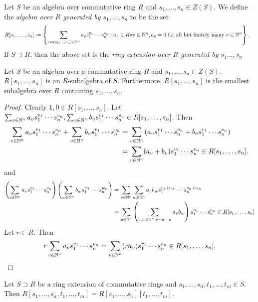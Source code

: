 \begin{definition}
    Let $S$ be an algebra over commutative ring $R$ and $s_1,\dots,s_n\in Z(S)$. We define the \textit{algebra over $R$ generated by $s_1,\dots,s_n$} to be the set 
    \begin{align*}
        R[s_1,\dots,s_n] &:= \left\{ \sum_{v=(v_1,\dots,v_n)\in \mathbb{N}^n} a_vs_1^{v_1}\cdots s_n^{v_n} : a_v\in R \forall v\in \mathbb{N}^n, a_v = 0 \text{ for all but finitely many } v\in \mathbb{N}^n \right\}.
    \end{align*}
    If $S\supset R$, then the above set is the \textit{ring extension over $R$ generated by $s_1\dots,s_n$}
\end{definition}
\begin{lemma}
    Let $S$ be an algebra over a commutative ring $R$ and $s_1,\dots,s_n\in Z(S)$. $R[s_1,\dots,s_n]$ is an $R$-subalgebra of $S$. Furthermore, $R[s_1,\dots,s_n]$ is the smallest subalgebra over $R$ containing $s_1,\dots,s_n$.   
\end{lemma}
\begin{proof}
    Clearly $1,0\in R[s_1,\dots,s_n]$. Let $\sum_{v\in \mathbb{N}^n} a_vs_1^{v_1}\cdots s_n^{v_n}, \sum_{v\in \mathbb{N}^n} b_vs_1^{v_1}\cdots s_n^{v_n}\in R[s_1,\dots,s_n]$. Then 
    \begin{align*}
        \sum_{v\in \mathbb{N}^n} a_vs_1^{v_1}\cdots s_n^{v_n}+\sum_{v\in \mathbb{N}^n} b_vs_1^{v_1}\cdots s_n^{v_n} &= \sum_{v\in \mathbb{N}^n} \left(a_vs_1^{v_1}\cdots s_n^{v_n}+b_vs_1^{v_1}\cdots s_n^{v_n}\right)\\ &= \sum_{v\in\mathbb{N}^n} (a_v+b_v)s_1^{v_1}\cdots s_n^{v_n} \in R[s_1,\dots,s_n].
    \end{align*}
    and 
    \begin{align*}
        \left(\sum_{v\in \mathbb{N}^n} a_vs_1^{v_1}\cdots s_n^{v_n}\right)\left(\sum_{w\in \mathbb{N}^n} b_ws_1^{w_1}\cdots s_n^{w_n}\right) &= \sum_{v\in \mathbb{N}^n}\sum_{w \in \mathbb{N}^n} a_vb_w s_1^{v_1+w_1}\cdots s_n^{v_n+w_n} \\
        &= \sum_{u\in \mathbb{N}^n} \left(\sum_{v,w\in \mathbb{N}^n : v+w = u} a_vb_w \right)s_1^{u_1}\cdots s_n^{u_n}\in R[s_1,\dots,s_n]
    \end{align*}
    Let $r\in R$. Then 
    $$r\sum_{v\in\mathbb{N}^n} a_vs_1^{v_1}\cdots s_n^{v_n} = \sum_{v\in\mathbb{N}^n} (ra_v)s_1^{v_1}\cdots s_n^{v_n}\in R[s_1,\dots,s_n].$$
\end{proof}
\begin{lemma}
    Let $S\supset R$ be a ring extension of commutative rings and $s_1,\dots,s_n,t_1,\dots,t_m\in S$. Then $R[s_1,\dots,s_n,t_1,\dots,t_m]=R[s_1,\dots,s_n][t_1,\dots,t_m].$
\end{lemma}
